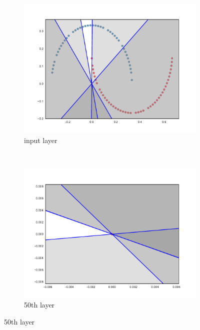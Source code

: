 \begin{figure}[h!]
  \centering
    \begin{subfigure}[b]{0.3\textwidth}
        \includegraphics[width=\textwidth]{img/init/relu/conv2d_1-0.pdf}
        \caption{\ReLU input layer}
        \label{fig:reluInitInput}
    \end{subfigure}
    ~ %
    \begin{subfigure}[b]{0.3\textwidth}
        \includegraphics[width=\textwidth]{img/init/relu/conv2d_50-0.pdf}
        \caption{\ReLU 50th layer}
        \label{fig:reluInit501}
    \end{subfigure}

\end{figure}

